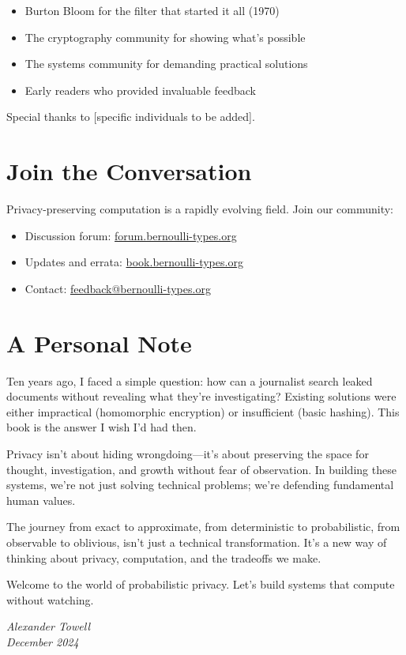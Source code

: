 \begin{itemize}
\item Burton Bloom for the filter that started it all (1970)
\item The cryptography community for showing what's possible
\item The systems community for demanding practical solutions
\item Early readers who provided invaluable feedback
\end{itemize}

Special thanks to [specific individuals to be added].

\section*{Join the Conversation}

Privacy-preserving computation is a rapidly evolving field. Join our community:

\begin{itemize}
\item Discussion forum: \url{forum.bernoulli-types.org}
\item Updates and errata: \url{book.bernoulli-types.org}
\item Contact: \url{feedback@bernoulli-types.org}
\end{itemize}

\section*{A Personal Note}

Ten years ago, I faced a simple question: how can a journalist search leaked documents without revealing what they're investigating? Existing solutions were either impractical (homomorphic encryption) or insufficient (basic hashing). This book is the answer I wish I'd had then.

Privacy isn't about hiding wrongdoing—it's about preserving the space for thought, investigation, and growth without fear of observation. In building these systems, we're not just solving technical problems; we're defending fundamental human values.

The journey from exact to approximate, from deterministic to probabilistic, from observable to oblivious, isn't just a technical transformation. It's a new way of thinking about privacy, computation, and the tradeoffs we make.

Welcome to the world of probabilistic privacy. Let's build systems that compute without watching.

\vspace{1cm}
\begin{flushright}
\textit{Alexander Towell}\\
\textit{December 2024}
\end{flushright}